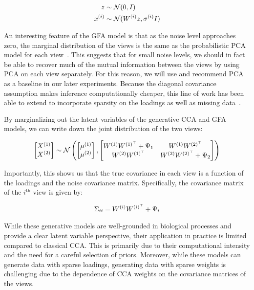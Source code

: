 \begin{align}
    z& \sim \mathcal{N}(0, I)\\
    x^{(i)} & \sim \mathcal{N}(W^{(i)} z, \sigma^{(i)}I)
\end{align}

An interesting feature of the GFA model is that as the noise level approaches zero, the marginal distribution of the views is the same as the probabilistic PCA model for each view~\citep{tipping1999probabilistic}.
This suggests that for small noise levels, we should in fact be able to recover much of the mutual information between the views by using PCA on each view separately.
For this reason, we will use and recommend PCA as a baseline in our later experiments.
Because the diagonal covariance assumption makes inference computationally cheaper, this line of work has been able to extend to incorporate sparsity on the loadings\citep{virtanen2011bayesian} as well as missing data~\citep{ferreira2022hierarchical}.

By marginalizing out the latent variables of the generative CCA and GFA models, we can write down the joint distribution of the two views:

\begin{align}
    \begin{bmatrix} X^{(1)} \\ X^{(2)} \end{bmatrix} \sim \mathcal{N} \left( \begin{bmatrix} \mu^{(1)} \\ \mu^{(2)} \end{bmatrix}, \begin{bmatrix} W^{(1)}W^{(1)^{\top}} + \Psi_1 & W^{(1)}W^{(2)^{\top}} \\ W^{(2)}W^{(1)^{\top}} & W^{(2)}W^{(2)^{\top}} + \Psi_2 \end{bmatrix} \right)
\end{align}

Importantly, this shows us that the true covariance in each view is a function of the loadings and the noise covariance matrix.
Specifically, the covariance matrix of the $i^{\text{th}}$ view is given by:

\begin{align}
    \Sigma_{ii} = W^{(i)}W^{(i)^{\top}} + \Psi_i
\end{align}

While these generative models are well-grounded in biological processes and provide a clear latent variable perspective, their application in practice is limited compared to classical CCA.
This is primarily due to their computational intensity and the need for a careful selection of priors.
Moreover, while these models can generate data with sparse loadings, generating data with sparse weights is challenging due to the dependence of CCA weights on the covariance matrices of the views.

